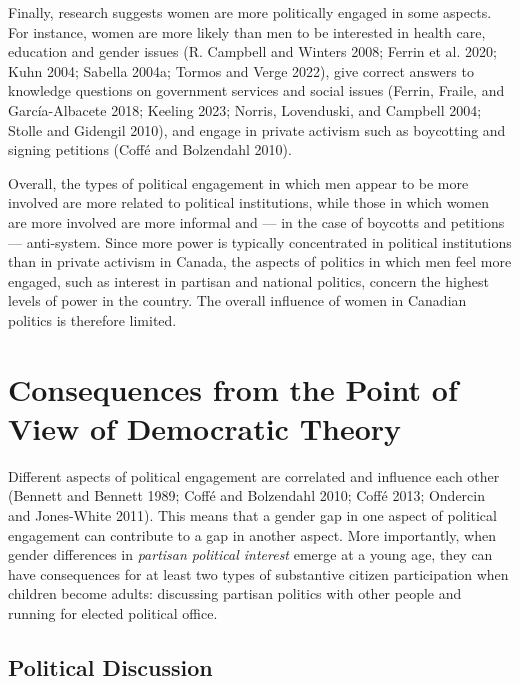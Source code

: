 \documentclass[
  letterpaper,
  DIV=11,
  numbers=noendperiod]{scrreprt}
\begin{document}
Finally, research suggests women are more politically engaged in some
aspects. For instance, women are more likely than men to be interested
in health care, education and gender issues (R. Campbell and Winters
2008; Ferrin et al. 2020; Kuhn 2004; Sabella 2004a; Tormos and Verge
2022), give correct answers to knowledge questions on government
services and social issues (Ferrin, Fraile, and García-Albacete 2018;
Keeling 2023; Norris, Lovenduski, and Campbell 2004; Stolle and Gidengil
2010), and engage in private activism such as boycotting and signing
petitions (Coffé and Bolzendahl 2010).

Overall, the types of political engagement in which men appear to be
more involved are more related to political institutions, while those in
which women are more involved are more informal and --- in the case of
boycotts and petitions --- anti-system. Since more power is typically
concentrated in political institutions than in private activism in
Canada, the aspects of politics in which men feel more engaged, such as
interest in partisan and national politics, concern the highest levels
of power in the country. The overall influence of women in Canadian
politics is therefore limited.

\hypertarget{consequences-from-the-point-of-view-of-democratic-theory}{%
\section{Consequences from the Point of View of Democratic
Theory}\label{consequences-from-the-point-of-view-of-democratic-theory}}

Different aspects of political engagement are correlated and influence
each other (Bennett and Bennett 1989; Coffé and Bolzendahl 2010; Coffé
2013; Ondercin and Jones-White 2011). This means that a gender gap in
one aspect of political engagement can contribute to a gap in another
aspect. More importantly, when gender differences in \emph{partisan
political interest} emerge at a young age, they can have consequences
for at least two types of substantive citizen participation when
children become adults: discussing partisan politics with other people
and running for elected political office.

\hypertarget{political-discussion}{%
\subsection{Political Discussion}\label{political-discussion}}
\end{document}

